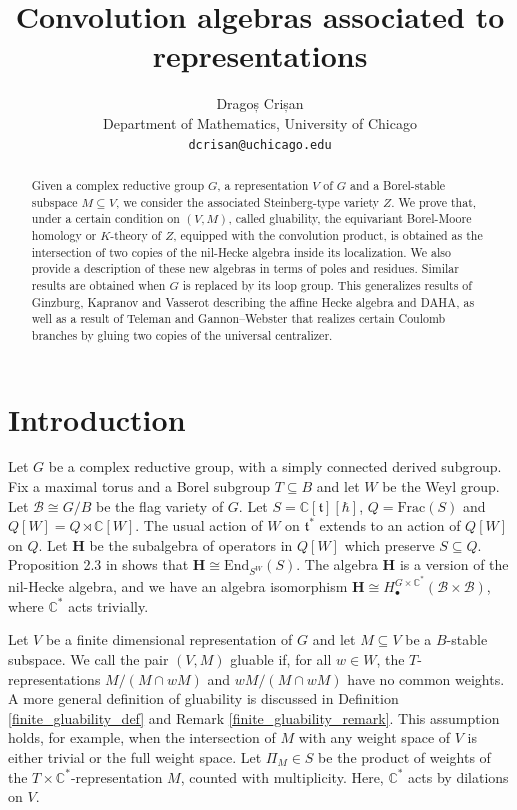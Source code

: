 \documentclass[11pt]{article}
\newcommand{\C}{\mathbb{C}}
\newcommand{\B}{\mathcal{B}}
\renewcommand{\H}{\textbf{H}}
\renewcommand{\t}{\mathfrak{t}}
\newcommand{\1}{\mathbb{1}}
\newcommand{\HBM}[2]{H_\bullet^{#1}(#2)}
\newcommand{\End}{\text{End}}
\renewcommand{\subset}{\subseteq}
\theoremstyle{definition}
\numberwithin{equation}{section}
\begin{document}
\title{Convolution algebras associated to representations}

\date{}
\author{Dragoș Crișan \\
  \small Department of Mathematics, University of Chicago \\
  \small \texttt{dcrisan@uchicago.edu}}

\maketitle

\begin{abstract}
Given a complex reductive group $G$, a representation $V$ of $G$ and a Borel-stable subspace $M \subset V$, we consider the associated Steinberg-type variety $Z$. We prove that, under a certain condition on $(V,M)$, called gluability, the equivariant Borel-Moore homology or $K$-theory of $Z$, equipped with the convolution product, is obtained as the intersection of two copies of the nil-Hecke algebra inside its localization. We also provide a description of these new algebras in terms of poles and residues. Similar results are obtained when $G$ is replaced by its loop group. This generalizes results of Ginzburg, Kapranov and Vasserot describing the affine Hecke algebra and DAHA, as well as a result of Teleman and Gannon--Webster that realizes certain Coulomb branches by gluing two copies of the universal centralizer.
\end{abstract}

\section{Introduction}
    
Let $G$ be a complex reductive group, with a simply connected derived subgroup. Fix a maximal torus and a Borel subgroup $T\subset B$ and let $W$ be the Weyl group. Let $\B \cong G/B$ be the flag variety of $G$. Let $S=\C[\t][\hbar]$, $Q=\text{Frac}(S)$ and $Q[W] = Q \rtimes \C[W]$. The usual action of $W$ on $\t^*$ extends to an action of $Q[W]$ on $Q$. Let $\H$ be the subalgebra of operators in $Q[W]$ which preserve $S\subset Q$. Proposition 2.3 in \cite{GKV} shows that $\H \cong \End_{S^W}(S)$. The algebra $\H$ is a version of the nil-Hecke algebra, and we have an algebra isomorphism $\H \cong \HBM{G\times \C^*}{\B \times \B}$, where $\C^*$ acts trivially.

Let $V$ be a finite dimensional representation of $G$ and let $M\subset V$ be a $B$-stable subspace. We call the pair $(V,M)$ gluable if, for all $w\in W$, the $T$-representations $M/(M \cap wM)$ and $wM / (M \cap wM)$ have no common weights. A more general definition of gluability is discussed in Definition \ref{finite_gluability_def} and Remark \ref{finite_gluability_remark}. This assumption holds, for example, when the intersection of $M$ with any weight space of $V$ is either trivial or the full weight space. Let $\Pi_M \in S$ be the product of weights of the $T\times \C^*$-representation $M$, counted with multiplicity. Here, $\C^*$ acts by dilations on $V$.
\end{document}
